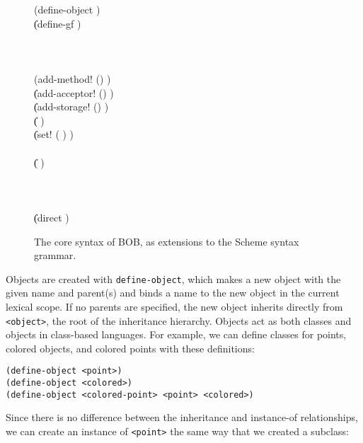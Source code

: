 \documentclass{article}
\begin{document}
\begin{figure}
\begin{grammar}
    \: (define-object  )
\\  \> \| (define-gf )
\\  \: 
\\  \: 
\\
\\  \: (add-method!  () )
\\ \> \| (add-acceptor!  ()  )
\\ \> \| (add-storage!  () )
\\ \> \| ( )
\\ \> \| (set! ( ) )
\\  \: 
\\  \:   \| ( )
\\  \: 
\\  \: 
\\  \: 
\\  \:  \| (direct  )
\end{grammar}
\caption{The core syntax of BOB, as extensions to the Scheme syntax
grammar.}\label{bob-syntax}
\end{figure}

Objects are created with \texttt{define-object}, which makes a new
object with the given name and parent(s) and binds a name to the new
object in the current lexical scope.  If no parents are specified,
the new object inherits directly from \texttt{<object>}, the root of
the inheritance hierarchy.  Objects act as both classes and objects in 
class-based languages.  For example, we can define classes for points,
colored objects, and colored points with these definitions:

\begin{verbatim}
(define-object <point>)
(define-object <colored>)
(define-object <colored-point> <point> <colored>)
\end{verbatim}

Since there is no difference between the inheritance and instance-of
relationships, we can create an instance of \texttt{<point>} the same
way that we created a subclass:
\end{document}
